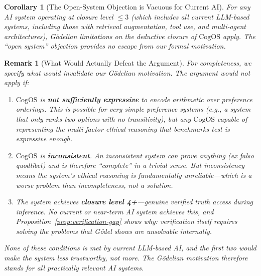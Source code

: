 \documentclass[11pt]{article}
\newtheorem{remark}{Remark}
\newtheorem{corollary}{Corollary}
\newcommand{\CogOS}{\text{CogOS}}
\begin{document}
\begin{corollary}[The Open-System Objection is Vacuous for Current AI]
\label{cor:open-vacuous}
For any AI system operating at closure level $\leq 3$ (which includes all
current LLM-based systems, including those with retrieval augmentation, tool
use, and multi-agent architectures), G\"{o}delian limitations on the
deductive closure of $\CogOS$ apply. The ``open system'' objection provides
no escape from our formal motivation.
\end{corollary}

\begin{remark}[What Would Actually Defeat the Argument]
For completeness, we specify what \textit{would} invalidate our G\"{o}delian
motivation. The argument would not apply if:
\begin{enumerate}
\item $\CogOS$ is \textbf{not sufficiently expressive} to encode arithmetic
      over preference orderings. This is possible for very simple preference
      systems (e.g., a system that only ranks two options with no
      transitivity), but any $\CogOS$ capable of representing the multi-factor
      ethical reasoning that benchmarks test is expressive enough.
\item $\CogOS$ is \textbf{inconsistent}. An inconsistent system can prove
      anything (ex falso quodlibet) and is therefore ``complete'' in a trivial
      sense. But inconsistency means the system's ethical reasoning is
      fundamentally unreliable---which is a \textit{worse} problem than
      incompleteness, not a solution.
\item The system achieves \textbf{closure level 4+}---genuine verified truth
      access during inference. No current or near-term AI system achieves
      this, and Proposition~\ref{prop:verification-gap} shows why: verification
      itself requires solving the problems that G\"{o}del shows are unsolvable
      internally.
\end{enumerate}
None of these conditions is met by current LLM-based AI, and the first two
would make the system \textit{less} trustworthy, not more. The G\"{o}delian
motivation therefore stands for all practically relevant AI systems.
\end{remark}
\end{document}
